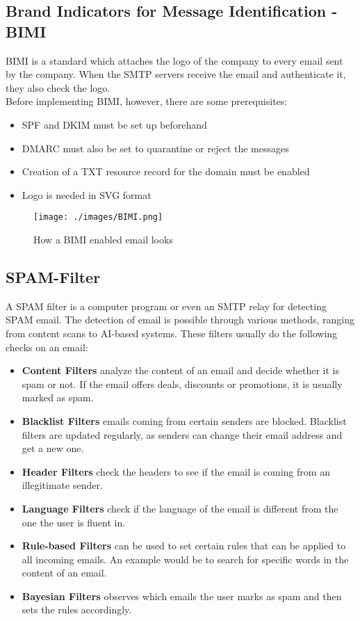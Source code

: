 \subsection{Brand Indicators for Message Identification - BIMI}
BIMI is a standard which attaches the logo of the company to every email sent by the company. When the SMTP servers receive the email and authenticate it, they also check the logo. \\
Before implementing BIMI, however, there are some prerequisites:
\begin{itemize}
    \item SPF and DKIM must be set up beforehand
    \item DMARC must also be set to quarantine or reject the messages
    \item Creation of a TXT resource record for the domain must be enabled
    \item Logo is needed in SVG format
\end{itemize}

\begin{figure}[h!]
    \centering
    \texttt{[image: ./images/BIMI.png]}
    \caption{How a BIMI enabled email looks}
\end{figure}

\newpage

\subsection{SPAM-Filter}
A SPAM filter is a computer program or even an SMTP relay for detecting SPAM email.
The detection of email is possible through various methods, ranging from content scans to AI-based systems.
These filters usually do the following checks on an email:

\begin{itemize}
    \item \textbf{Content Filters} analyze the content of an email and decide whether it is spam or not. If the email offers deals, discounts or promotions, it is usually marked as spam.
    \item \textbf{Blacklist Filters} emails coming from certain senders are blocked. Blacklist filters are updated regularly, as senders can change their email address and get a new one.
    \item \textbf{Header Filters} check the headers to see if the email is coming from an illegitimate sender.
    \item \textbf{Language Filters} check if the language of the email is different from the one the user is fluent in.
    \item \textbf{Rule-based Filters} can be used to set certain rules that can be applied to all incoming emails. An example would be to search for specific words in the content of an email.
    \item \textbf{Bayesian Filters} observes which emails the user marks as spam and then sets the rules accordingly.
\end{itemize}


